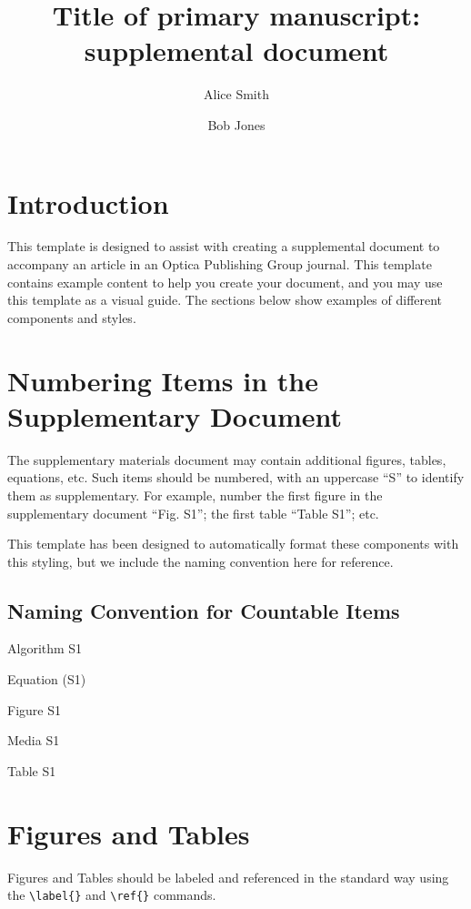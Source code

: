 \documentclass[9pt]{osa-supplemental-document}
\title{Title of primary manuscript: supplemental document}
\author[1]{Alice Smith}
\author[2]{Bob Jones}
\affil[1]{Department of Mathematics, University X}
\affil[2]{Department of Biology, University Y}
\begin{document}
\maketitle

\section{Introduction}

This template is designed to assist with creating a supplemental document to accompany an article in an Optica Publishing Group journal. This template contains example content to help you create your document, and you may use this template as a visual guide. The sections below show examples of different components and styles.


\section{Numbering Items in the Supplementary Document}

The supplementary materials document may contain additional figures, tables, equations, etc. Such items should be numbered, with an uppercase “S” to identify them as supplementary. For example, number the first figure in the supplementary document “Fig. S1”; the first table “Table S1”; etc.

This template has been designed to automatically format these components with this styling, but we include the naming convention here for reference.

\subsection*{Naming Convention for Countable Items}

\begin{condenseditemize}
\item[] Algorithm S1
\item[] Equation (S1)
\item[] Figure S1
\item[] Media S1
\item[] Table S1
\end{condenseditemize}


\section{Figures and Tables}
Figures and Tables should be labeled and referenced in the standard way using the \verb|\label{}| and \verb|\ref{}| commands.
\end{document}

